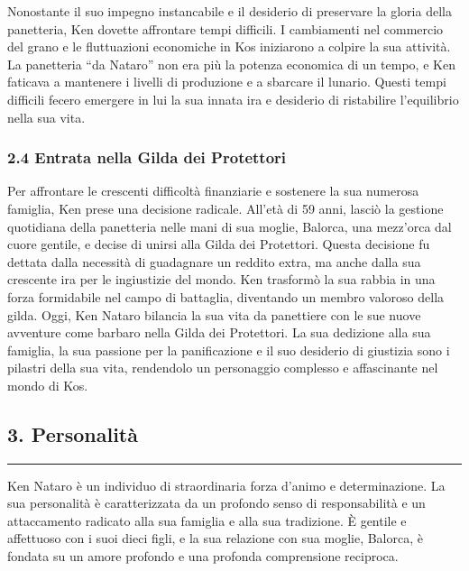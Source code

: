 Nonostante il suo impegno instancabile e il desiderio di preservare la
gloria della panetteria, Ken dovette affrontare tempi difficili. I
cambiamenti nel commercio del grano e le fluttuazioni economiche in Kos
iniziarono a colpire la sua attività. La panetteria ``da Nataro'' non
era più la potenza economica di un tempo, e Ken faticava a mantenere i
livelli di produzione e a sbarcare il lunario. Questi tempi difficili
fecero emergere in lui la sua innata ira e desiderio di ristabilire
l'equilibrio nella sua vita.

\subsubsection{\texorpdfstring{2.4 Entrata ne\textbf{lla Gilda dei
Protettori}}{2.4 Entrata nella Gilda dei Protettori}}\label{entrata-nella-gilda-dei-protettori}

Per affrontare le crescenti difficoltà finanziarie e sostenere la sua
numerosa famiglia, Ken prese una decisione radicale. All'età di 59 anni,
lasciò la gestione quotidiana della panetteria nelle mani di sua moglie,
Balorca, una mezz'orca dal cuore gentile, e decise di unirsi alla Gilda
dei Protettori. Questa decisione fu dettata dalla necessità di
guadagnare un reddito extra, ma anche dalla sua crescente ira per le
ingiustizie del mondo. Ken trasformò la sua rabbia in una forza
formidabile nel campo di battaglia, diventando un membro valoroso della
gilda. Oggi, Ken Nataro bilancia la sua vita da panettiere con le sue
nuove avventure come barbaro nella Gilda dei Protettori. La sua
dedizione alla sua famiglia, la sua passione per la panificazione e il
suo desiderio di giustizia sono i pilastri della sua vita, rendendolo un
personaggio complesso e affascinante nel mondo di Kos.

\subsection{3. Personalità}\label{personalituxe0}

\begin{center}\rule{0.5\linewidth}{0.5pt}\end{center}

Ken Nataro è un individuo di straordinaria forza d'animo e
determinazione. La sua personalità è caratterizzata da un profondo senso
di responsabilità e un attaccamento radicato alla sua famiglia e alla
sua tradizione. È gentile e affettuoso con i suoi dieci figli, e la sua
relazione con sua moglie, Balorca, è fondata su un amore profondo e una
profonda comprensione reciproca.

